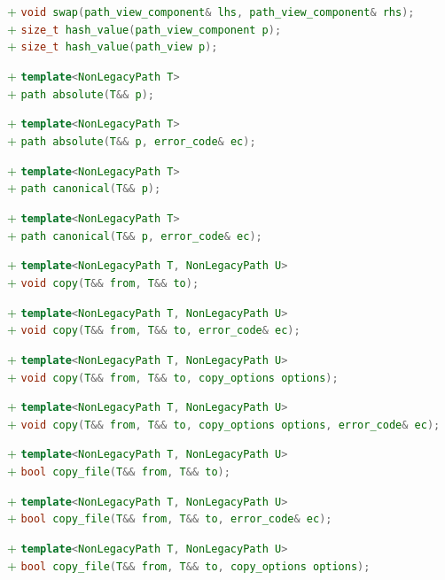 \documentclass[11pt]{article}
\newcommand{\code}[2][cpp]{\lstinline[language=#1,basicstyle=\small\ttfamily]{#2}}
\newcommand{\tsreplace}[3]{\textcolor{red}{\sout{#1}}#2\textcolor{darkgreen}{#3}}
\begin{document}
\tsreplace{}{}{+ \code{void swap(path_view_component& lhs, path_view_component& rhs);}}\\
\tsreplace{}{}{+ \code{size_t hash_value(path_view_component p);}}\\
\tsreplace{}{}{+ \code{size_t hash_value(path_view p);}}

\tsreplace{}{}{+ \code{template<NonLegacyPath T>}}\\
\tsreplace{}{}{+ \code{path absolute(T&& p);}}

\tsreplace{}{}{+ \code{template<NonLegacyPath T>}}\\
\tsreplace{}{}{+ \code{path absolute(T&& p, error_code& ec);}}

\tsreplace{}{}{+ \code{template<NonLegacyPath T>}}\\
\tsreplace{}{}{+ \code{path canonical(T&& p);}}

\tsreplace{}{}{+ \code{template<NonLegacyPath T>}}\\
\tsreplace{}{}{+ \code{path canonical(T&& p, error_code& ec);}}

\tsreplace{}{}{+ \code{template<NonLegacyPath T, NonLegacyPath U>}}\\
\tsreplace{}{}{+ \code{void copy(T&& from, T&& to);}}

\tsreplace{}{}{+ \code{template<NonLegacyPath T, NonLegacyPath U>}}\\
\tsreplace{}{}{+ \code{void copy(T&& from, T&& to, error_code& ec);}}

\tsreplace{}{}{+ \code{template<NonLegacyPath T, NonLegacyPath U>}}\\
\tsreplace{}{}{+ \code{void copy(T&& from, T&& to, copy_options options);}}

\tsreplace{}{}{+ \code{template<NonLegacyPath T, NonLegacyPath U>}}\\
\tsreplace{}{}{+ \code{void copy(T&& from, T&& to, copy_options options, error_code& ec);}}

\tsreplace{}{}{+ \code{template<NonLegacyPath T, NonLegacyPath U>}}\\
\tsreplace{}{}{+ \code{bool copy_file(T&& from, T&& to);}}

\tsreplace{}{}{+ \code{template<NonLegacyPath T, NonLegacyPath U>}}\\
\tsreplace{}{}{+ \code{bool copy_file(T&& from, T&& to, error_code& ec);}}

\tsreplace{}{}{+ \code{template<NonLegacyPath T, NonLegacyPath U>}}\\
\tsreplace{}{}{+ \code{bool copy_file(T&& from, T&& to, copy_options options);}}
\end{document}
